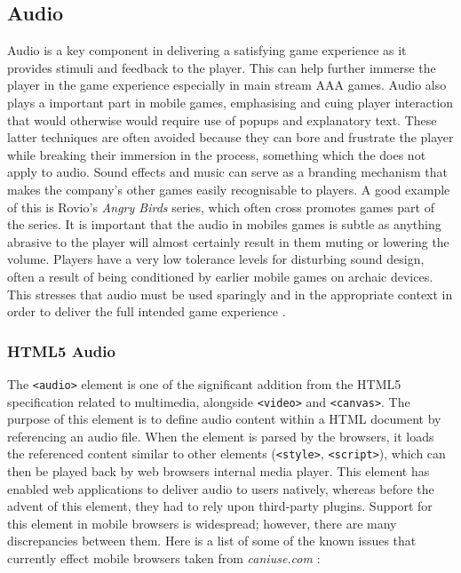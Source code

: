 \documentclass[final]{cmpreport}
\begin{document}
\subsection{Audio}
 Audio is a key component in delivering a satisfying game experience as it provides stimuli and feedback to the player. This can help further immerse the player in the game experience especially in main stream AAA games. Audio also plays a important part in mobile games, emphasising and cuing player interaction that would otherwise would require use of popups and explanatory text. These latter techniques are often avoided because they can bore and frustrate the player while breaking their immersion in the process, something which the does not apply to audio. Sound effects and music can serve as a branding mechanism that makes the company's other games easily recognisable to players. A good example of this is Rovio's \textit{Angry Birds} series, which often cross promotes games part of the series. It is important that the audio in mobiles games is subtle as anything abrasive to the player will almost certainly result in them muting or lowering the volume. Players have a very low tolerance levels for disturbing sound design, often a result of being conditioned by earlier mobile games on archaic devices. This stresses that audio must be used sparingly and in the appropriate context in order to deliver the full intended game experience \citep{Thomas}.

\subsubsection{HTML5 Audio}

The \texttt{<audio>} element is one of the significant addition from the HTML5 specification related to multimedia, alongside \texttt{<video>} and \texttt{<canvas>}. The purpose of this element is to define audio content within a HTML document by referencing an audio file. When the element is parsed by the browsers, it loads the referenced content similar to other elements (\texttt{<style>}, \texttt{<script>}), which can then be played back by web browsers internal media player. This element has enabled web applications to deliver audio to users natively, whereas before the advent of this element, they had to rely upon third-party plugins. Support for this element in mobile browsers is widespread; however, there are many discrepancies between them. Here is a list of some of the known issues that currently effect mobile browsers taken from \textit{caniuse.com} \footnotemark :
\end{document}
